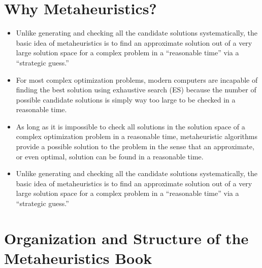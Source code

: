 \documentclass[
  letterpaper,
  DIV=11,
  numbers=noendperiod]{scrreprt}
\providecommand{\tightlist}{%
  \setlength{\itemsep}{0pt}\setlength{\parskip}{0pt}}\usepackage{longtable,booktabs,array}
\begin{document}

\chapter{Why Metaheuristics?}\label{why-metaheuristics}

\begin{itemize}
\tightlist
\item
  Unlike generating and checking all the candidate solutions
  systematically, the basic idea of metaheuristics is to find an
  approximate solution out of a very large solution space for a complex
  problem in a ``reasonable time'' via a ``strategic guess.''
\item
  For most complex optimization problems, modern computers are incapable
  of finding the best solution using exhaustive search (ES) because the
  number of possible candidate solutions is simply way too large to be
  checked in a reasonable time.
\item
  As long as it is impossible to check all solutions in the solution
  space of a complex optimization problem in a reasonable time,
  metaheuristic algorithms provide a possible solution to the problem in
  the sense that an approximate, or even optimal, solution can be found
  in a reasonable time.
\item
  Unlike generating and checking all the candidate solutions
  systematically, the basic idea of metaheuristics is to find an
  approximate solution out of a very large solution space for a complex
  problem in a ``reasonable time'' via a ``strategic guess.''
\end{itemize}


\chapter{Organization and Structure of the Metaheuristics
Book}\label{organization-and-structure-of-the-metaheuristics-book}
\end{document}
